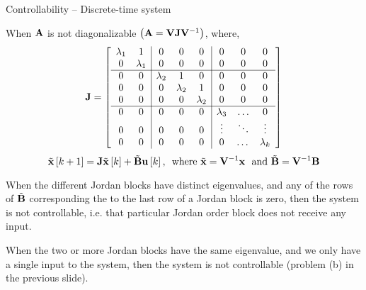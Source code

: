 \documentclass[aspectratio=169]{beamer}
\def\mf{\ensuremath\mathbf}
\def\lp{\ensuremath\left(}
\def\rp{\ensuremath\right)}
\def\ls{\ensuremath\left[}
\def\rs{\ensuremath\right]}
\newcommand{\ct}[1]{\lp #1\rp}
\newcommand{\dt}[1]{\ls #1\rs}
\begin{document}
\begin{frame}{Controllability -- Discrete-time system}
\begin{small}
When $\mf{A}$ is not diagonalizable $\ct{\mf{A} = \mf{V}\mf{J}\mf{V}^{-1}}$, where,\vspace{-0.2cm}
{\scriptsize \[ \mf{J} = \left[
\begin{array}{cc|ccc|ccc}
\lambda_1 & 1 & 0 & 0 & 0 & 0 & 0 & 0 \\
0 & \lambda_1 & 0 & 0 & 0 & 0 & 0 & 0 \\
\hline
0 & 0 & \lambda_2 & 1 & 0 & 0 & 0 & 0 \\
0 & 0 & 0 & \lambda_2 & 1 & 0 & 0 & 0 \\
0 & 0 & 0 & 0 & \lambda_2 & 0 & 0 & 0 \\
\hline
0 & 0 & 0 & 0 & 0 & \lambda_3 & \ldots & 0 \\
0 & 0 & 0 & 0 & 0 & \vdots & \ddots & \vdots \\
0 & 0 & 0 & 0 & 0 & 0 & \dots & \lambda_k
\end{array}
\right]
\]}
\vspace{-0.25cm}
\[ \tilde{\mf{x}}\dt{k+1} = \mf{J}\tilde{\mf{x}}\dt{k} + \tilde{\mf{B}}\mf{u}\dt{k}, \,\,\,\text{where } \tilde{\mf{x}} = \mf{V}^{-1}\mf{x} \,\, \text{ and } \tilde{\mf{B}} = \mf{V}^{-1}\mf{B} \]

When the different Jordan blocks have distinct eigenvalues, and any of the rows of $\tilde{\mf{B}}$ corresponding the to the last row of a Jordan block is zero, then the system is not controllable, i.e. that particular Jordan order block does not receive any input.\vspace{0.1cm}

When the two or more Jordan blocks have the same eigenvalue, and we only have a single input to the system, then the system is not controllable (problem (b) in the previous slide).\vspace{0.2cm}
\end{small}
\end{frame}
\end{document}
